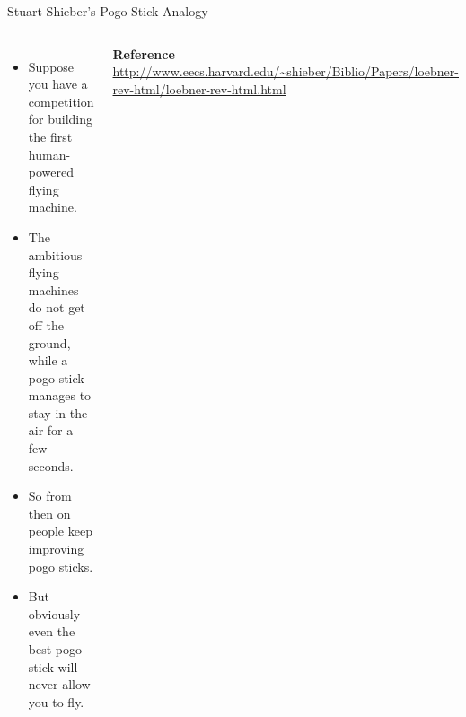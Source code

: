 \documentclass[xcolor={usenames,svgnames,x11names,dvipsnames,table}]{beamer}
\begin{document}
\begin{frame}{Stuart Shieber's Pogo Stick Analogy}
    \begin{columns}
            \begin{itemize}
                \item Suppose you have a competition for building the first human-powered\\
                    flying machine.
                \item The ambitious flying machines do not get off the ground, while a pogo stick manages to stay in the air for a few seconds.
                \item So from then on people keep improving pogo sticks.
                \item But obviously even the best pogo stick will never allow you to fly.
            \end{itemize}

        \bigskip
        \footnotesize{\textbf{Reference}\\
            \url{http://www.eecs.harvard.edu/~shieber/Biblio/Papers/loebner-rev-html/loebner-rev-html.html}
        }

            \includegraphics[width=1\linewidth]{./img/shieber}
    \end{columns}
\end{frame}
\end{document}
